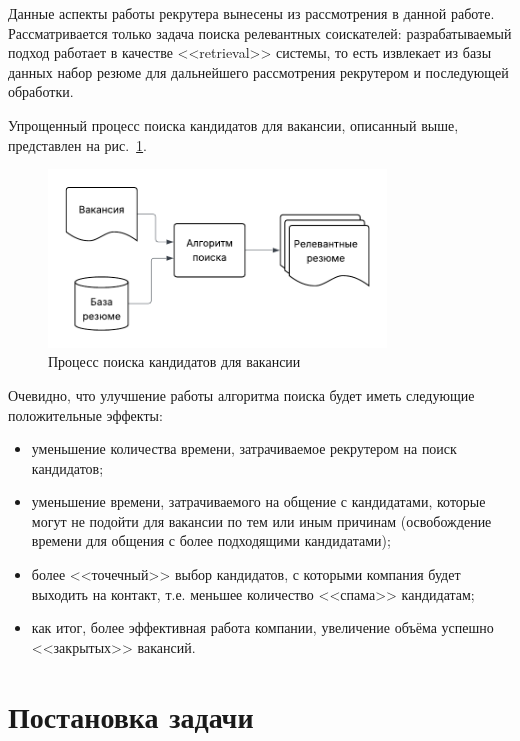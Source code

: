 \documentclass[14pt]{mmcs_article}
\begin{document}
Данные аспекты работы рекрутера вынесены из рассмотрения в данной работе. Рассматривается только задача поиска релевантных соискателей: разрабатываемый подход работает в качестве <<retrieval>> системы, то есть извлекает из базы данных набор резюме для дальнейшего рассмотрения рекрутером и последующей обработки.

Упрощенный процесс поиска кандидатов для вакансии, описанный выше, представлен на рис.~\ref{fig:candidate_search_process}.

\begin{figure}[h]
  \centering
  \includegraphics[width=0.8\textwidth]{plots/candidate_search_process.pdf}
  \caption{\centering Процесс поиска кандидатов для вакансии}
  \label{fig:candidate_search_process}
\end{figure}

Очевидно, что улучшение работы алгоритма поиска будет иметь следующие положительные эффекты:

\begin{itemize}
  \item уменьшение количества времени, затрачиваемое рекрутером на поиск кандидатов;
  \item уменьшение времени, затрачиваемого на общение с кандидатами, которые могут не подойти для вакансии по тем или иным причинам
        (освобождение времени для общения с более подходящими кандидатами);
  \item более <<точечный>> выбор кандидатов, с которыми компания будет выходить на контакт, т.е. меньшее количество <<спама>> кандидатам;
  \item как итог, более эффективная работа компании, увеличение объёма успешно <<закрытых>> вакансий.
\end{itemize}

\newpage
{}
\section*{Постановка задачи}\label{problem_statement}
\end{document}
